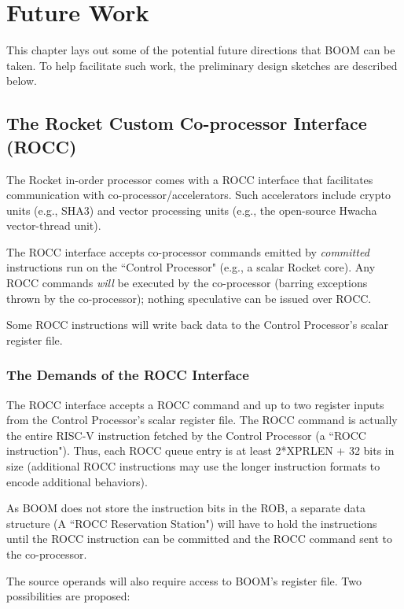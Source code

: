 \chapter{Future Work}

This chapter lays out some of the potential future directions that BOOM can be taken.  To help facilitate such work, the preliminary design sketches are described below. 

\section{The Rocket Custom Co-processor Interface (ROCC)}

The Rocket in-order processor comes with a ROCC interface that facilitates communication with co-processor/accelerators.  Such accelerators include crypto units (e.g., SHA3) and vector processing units (e.g., the open-source Hwacha vector-thread unit\cite{hwacha}). 

The ROCC interface accepts co-processor commands emitted by {\em committed} instructions run on the ``Control Processor" (e.g., a scalar Rocket core).  Any ROCC commands {\em will} be executed by the co-processor (barring exceptions thrown by the co-processor); nothing speculative can be issued over ROCC. 

Some ROCC instructions will write back data to the Control Processor's scalar register file. 

\subsection{The Demands of the ROCC Interface}


The ROCC interface accepts a ROCC command and up to two register inputs from the Control Processor's scalar register file. 
The ROCC command is actually the entire RISC-V instruction fetched by the Control Processor (a ``ROCC instruction"). Thus, each ROCC queue entry is at least 2*XPRLEN + 32 bits in size (additional ROCC instructions may use the longer instruction formats to encode additional behaviors). 

As BOOM does not store the instruction bits in the ROB, a separate data structure (A ``ROCC Reservation Station") will have to hold the instructions until the ROCC instruction can be committed and the ROCC command sent to the co-processor. 

The source operands will also require access to BOOM's register file.  Two possibilities are proposed:

